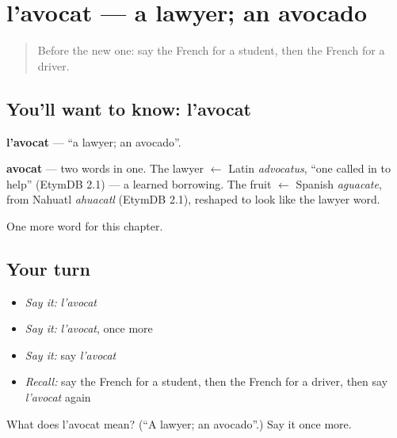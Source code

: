 \section[l'avocat]{l'avocat — a lawyer; an avocado}

\label{lesson:FR-C124-avocat}



\begin{quote}
Before the new one: say the French for a student, then the French for a driver.
\end{quote}

\subsection*{You'll want to know: l'avocat}
\textbf{l'avocat} — \textquotedblleft{}a lawyer; an avocado\textquotedblright{}.

\begin{cousinweb}
\textbf{avocat} — two words in one. The lawyer $\leftarrow$ Latin \emph{advocatus}, \textquotedblleft{}one called in to help\textquotedblright{} (EtymDB 2.1) — a learned borrowing. The fruit $\leftarrow$ Spanish \emph{aguacate}, from Nahuatl \emph{ahuacatl} (EtymDB 2.1), reshaped to look like the lawyer word.
\end{cousinweb}

\begin{grammarlens}[title={What you've built}]
One more word for this chapter.
\end{grammarlens}

\subsection*{Your turn}
\begin{itemize}
\raggedright
  \item \emph{Say it:} \emph{l'avocat}
  \item \emph{Say it:} \emph{l'avocat}, once more
  \item \emph{Say it:} say \emph{l'avocat}
  \item \emph{Recall:} say the French for a student, then the French for a driver, then say \emph{l'avocat} again
\end{itemize}

\begin{tcolorbox}[breakable,colback=teal!4,colframe=teal!35!black,title={Before you move on}]
What does l'avocat mean? (\textquotedblleft{}A lawyer; an avocado\textquotedblright{}.) Say it once more.
\end{tcolorbox}
